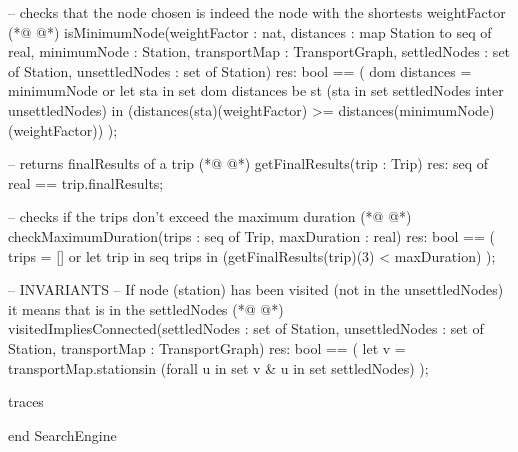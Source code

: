 \begin{vdmpp}[breaklines=true]
 -- checks that the node chosen is indeed the node with the shortests weightFactor
(*@
\label{isMinimumNode:559}
@*)
 isMinimumNode(weightFactor : nat, distances : map Station to seq of real, minimumNode : Station, transportMap : TransportGraph, settledNodes : set of Station, unsettledNodes : set of Station) res: bool ==
 (
  dom distances = {minimumNode} 
  or
  let sta in set dom distances
  be st (sta in set settledNodes inter unsettledNodes)
  in (distances(sta)(weightFactor) >= distances(minimumNode)(weightFactor))
 );
 
 -- returns finalResults of a trip
(*@
\label{getFinalResults:569}
@*)
 getFinalResults(trip : Trip) res: seq of real == trip.finalResults;
 
 -- checks if the trips don't exceed the maximum duration
(*@
\label{checkMaximumDuration:572}
@*)
 checkMaximumDuration(trips : seq of Trip, maxDuration : real) res: bool ==
 (
  trips  = [] or
  let trip in seq trips 
  in (getFinalResults(trip)(3) < maxDuration)
 );
 
 -- INVARIANTS
 -- If node (station) has been visited (not in the unsettledNodes) it means that is in the settledNodes
(*@
\label{visitedImpliesConnected:581}
@*)
 visitedImpliesConnected(settledNodes : set of Station, unsettledNodes : set of Station, transportMap : TransportGraph) res: bool ==
 (
  let v = transportMap.stations\unsettledNodes in (forall u in set v & u in set settledNodes) 
 );

traces

end SearchEngine
\end{vdmpp}
\bigskip
